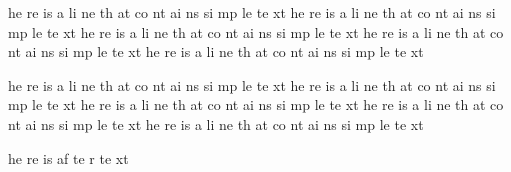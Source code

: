 he
re
is
a
li
ne
th
at
co
nt
ai
ns
si
mp
le
te
xt
he
re
is
a
li
ne
th
at
co
nt
ai
ns
si
mp
le
te
xt
he
re
is
a
li
ne
th
at
co
nt
ai
ns
si
mp
le
te
xt
he
re
is
a
li
ne
th
at
co
nt
ai
ns
si
mp
le
te
xt
he
re
is
a
li
ne
th
at
co
nt
ai
ns
si
mp
le
te
xt

he
re
is
a
li
ne
th
at
co
nt
ai
ns
si
mp
le
te
xt
he
re
is
a
li
ne
th
at
co
nt
ai
ns
si
mp
le
te
xt
he
re
is
a
li
ne
th
at
co
nt
ai
ns
si
mp
le
te
xt
he
re
is
a
li
ne
th
at
co
nt
ai
ns
si
mp
le
te
xt
he
re
is
a
li
ne
th
at
co
nt
ai
ns
si
mp
le
te
xt

he
re
is
af
te
r
te
xt
